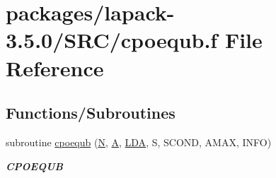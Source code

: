 \hypertarget{cpoequb_8f}{}\section{packages/lapack-\/3.5.0/\+S\+R\+C/cpoequb.f File Reference}
\label{cpoequb_8f}
\subsection*{Functions/\+Subroutines}
\begin{DoxyCompactItemize}
\item 
subroutine \hyperlink{group__complexPOcomputational_ga02421020615f3c0fe23637cbad9dea9e}{cpoequb} (\hyperlink{polmisc_8c_a0240ac851181b84ac374872dc5434ee4}{N}, \hyperlink{classA}{A}, \hyperlink{example__user_8c_ae946da542ce0db94dced19b2ecefd1aa}{L\+D\+A}, S, S\+C\+O\+N\+D, A\+M\+A\+X, I\+N\+F\+O)
\begin{DoxyCompactList}\small\item\em {\bfseries C\+P\+O\+E\+Q\+U\+B} \end{DoxyCompactList}\end{DoxyCompactItemize}
